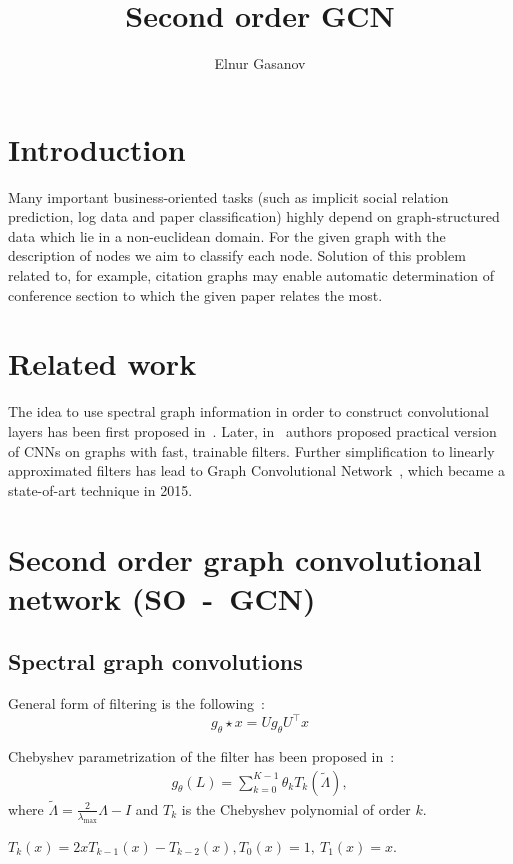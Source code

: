 \documentclass{article}
\title{Second order GCN}
\date{}
\author{Elnur Gasanov}
\begin{document}
\maketitle

\section{Introduction}

Many important business-oriented tasks (such as implicit social relation prediction, log data and paper classification) highly depend on graph-structured data which lie in a non-euclidean domain. For the given graph with the description of nodes we aim to classify each node. Solution of this problem related to, for example, citation graphs may enable automatic determination of conference section to which the given paper relates the most.

\section{Related work}

The idea to use spectral graph information in order to construct convolutional layers has been first proposed in~\cite{first_paper}. Later, in~\cite{CNN_LSF} authors proposed practical version of CNNs on graphs with fast, trainable filters. Further simplification to linearly approximated filters has lead to Graph Convolutional Network~\cite{GCN}, which became a state-of-art technique in 2015. 
\section{Second order graph convolutional network (SO~-~GCN)}
\subsection{Spectral graph convolutions}

General form of filtering is the following~\cite{first_paper}:
\[
g_\theta \star x = Ug_\theta U^\top x 
\]

Chebyshev parametrization of the filter has been proposed in~\cite{CNN_LSF}:
\begin{align}
g_\theta(L) = \sum\limits_{k=0}^{K-1} \theta_k T_k(\tilde{\Lambda}), \label{eq}
\end{align}
where $\tilde{\Lambda} = \frac{2}{\lambda_{\max}} \Lambda - I$ and  $T_k$ is the Chebyshev polynomial of order $k$. 

$T_k(x) = 2 x T_{k-1}(x) - T_{k-2}(x), T_0(x) = 1, \ T_1(x) = x$. 
\end{document}

